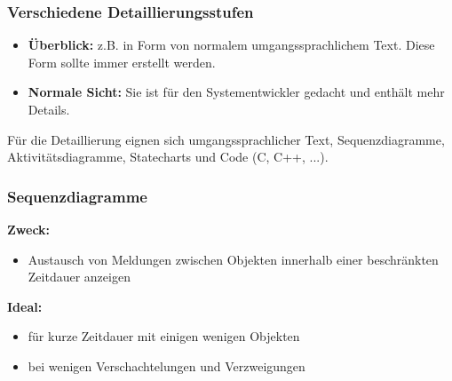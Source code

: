 \subsubsection{Verschiedene Detaillierungsstufen}
\begin{itemize}
	\item \textbf{Überblick: } z.B. in Form von normalem umgangssprachlichem Text. Diese Form sollte immer erstellt werden.
	\item \textbf{Normale Sicht: } Sie ist für den Systementwickler gedacht und enthält mehr Details.
\end{itemize}

Für die Detaillierung eignen sich umgangssprachlicher Text, Sequenzdiagramme, Aktivitätsdiagramme, Statecharts und Code (C, C++, ...).

\subsubsection{Sequenzdiagramme}
\begin{multicols}{2}
	\textbf{Zweck:}
	\begin{itemize}
		\item Austausch von Meldungen zwischen Objekten innerhalb einer beschränkten Zeitdauer anzeigen
	\end{itemize}
	\vfill\null
	\columnbreak
	\textbf{Ideal:}
	\begin{itemize}
		\item für kurze Zeitdauer mit einigen wenigen Objekten
		\item bei wenigen Verschachtelungen und Verzweigungen
	\end{itemize}
\end{multicols}

